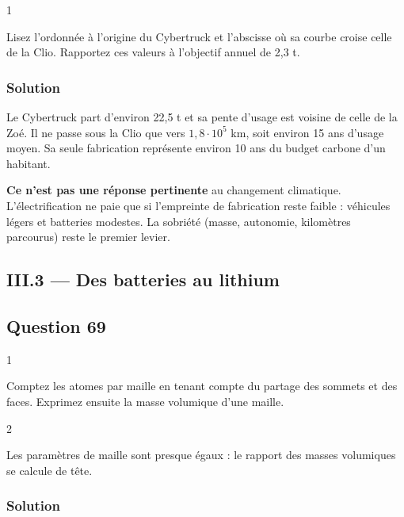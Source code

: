 \documentclass[11pt,a4paper]{article}
\begin{document}
\begin{indication}{1}

Lisez l'ordonnée à l'origine du Cybertruck et l'abscisse où sa courbe croise celle de la Clio. Rapportez ces valeurs à l'objectif annuel de 2,3 t.

\end{indication}

\hypertarget{solution-67}{%
\subsubsection{Solution}\label{solution-67}}

Le Cybertruck part d'environ 22,5 t et sa pente d'usage est voisine de celle de la Zoé. Il ne passe sous la Clio que vers \(1{,}8\cdot10^5\) km, soit environ 15 ans d'usage moyen. Sa seule fabrication représente environ 10 ans du budget carbone d'un habitant.

\textbf{Ce n'est pas une réponse pertinente} au changement climatique. L'électrification ne paie que si l'empreinte de fabrication reste faible : véhicules légers et batteries modestes. La sobriété (masse, autonomie, kilomètres parcourus) reste le premier levier.

\hypertarget{iii.3-des-batteries-au-lithium}{%
\subsection{III.3 --- Des batteries au lithium}\label{iii.3-des-batteries-au-lithium}}

\hypertarget{question-69}{%
\subsection{Question 69}\label{question-69}}

\begin{indication}{1}

Comptez les atomes par maille en tenant compte du partage des sommets et des faces. Exprimez ensuite la masse volumique d'une maille.

\end{indication}

\begin{indication}{2}

Les paramètres de maille sont presque égaux : le rapport des masses volumiques se calcule de tête.

\end{indication}

\hypertarget{solution-68}{%
\subsubsection{Solution}\label{solution-68}}
\end{document}
